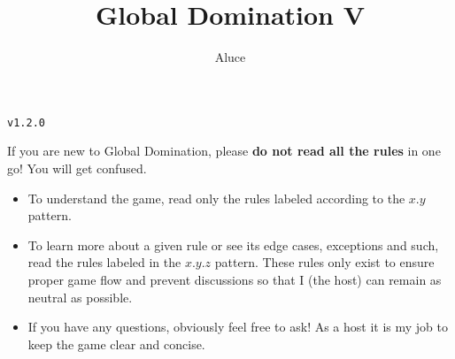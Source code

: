 \documentclass[10pt,openright,a4paper,openany]{article}
\newenvironment{warn}{
	\begin{tcolorbox}[
		colback=purple!5!white,
		colframe=purple!75!black,
	]
}{
	\end{tcolorbox}
}
\begin{document}
\title{Global Domination V}
\author{Aluce}
\maketitle

\begin{center}
\texttt{v1.2.0}
\end{center}

\begin{warn}
	\tcblower 
	If you are new to Global Domination, please \textbf{do not read all the rules} in one go! You will get confused.
	\begin{itemize}
		\item To understand the game, read only the rules labeled according to the $x.y$ pattern.
		\item To learn more about a given rule or see its edge cases, exceptions and such, read the rules labeled in the $x.y.z$ pattern. These rules only exist to ensure proper game flow and prevent discussions so that I (the host) can remain as neutral as possible.
		\item If you have any questions, obviously feel free to ask! As a host it is my job to keep the game clear and concise.
	\end{itemize} 
\end{warn}
\end{document}
